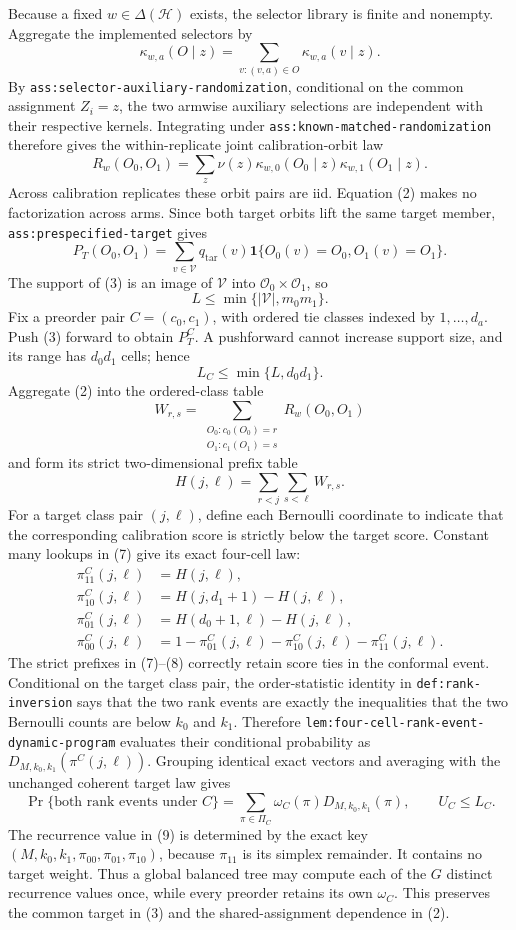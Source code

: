 Because a fixed \(w\in\Delta(\mathcal H)\) exists, the selector library is finite and nonempty. Aggregate the implemented selectors by
\[
\kappa_{w,a}(O\mid z)=\sum_{v:(v,a)\in O}\kappa_{w,a}(v\mid z).
\tag{1}
\]
By \texttt{ass:selector-auxiliary-randomization}, conditional on the common assignment \(Z_i=z\), the two armwise auxiliary selections are independent with their respective kernels. Integrating under \texttt{ass:known-matched-randomization} therefore gives the within-replicate joint calibration-orbit law
\[
R_w(O_0,O_1)=\sum_z\nu(z)\kappa_{w,0}(O_0\mid z)\kappa_{w,1}(O_1\mid z).
\tag{2}
\]
Across calibration replicates these orbit pairs are iid. Equation (2) makes no factorization across arms. Since both target orbits lift the same target member, \texttt{ass:prespecified-target} gives
\[
P_T(O_0,O_1)=\sum_{v\in\mathcal V}q_{\mathrm{tar}}(v)\mathbf 1\{O_0(v)=O_0, O_1(v)=O_1\}.
\tag{3}
\]
The support of (3) is an image of \(\mathcal V\) into \(\mathcal O_0\times\mathcal O_1\), so
\[
L\le\min\{|\mathcal V|,m_0m_1\}.
\tag{4}
\]
Fix a preorder pair \(C=(c_0,c_1)\), with ordered tie classes indexed by \(1,\ldots,d_a\). Push (3) forward to obtain \(P_T^C\). A pushforward cannot increase support size, and its range has \(d_0d_1\) cells; hence
\[
L_C\le\min\{L,d_0d_1\}.
\tag{5}
\]
Aggregate (2) into the ordered-class table
\[
W_{r,s}=\sum_{\substack{O_0:c_0(O_0)=r\\O_1:c_1(O_1)=s}}R_w(O_0,O_1)
\tag{6}
\]
and form its strict two-dimensional prefix table
\[
H(j,\ell)=\sum_{r<j}\sum_{s<\ell}W_{r,s}.
\tag{7}
\]
For a target class pair \((j,\ell)\), define each Bernoulli coordinate to indicate that the corresponding calibration score is strictly below the target score. Constant many lookups in (7) give its exact four-cell law:
\[
\begin{aligned}
\pi^C_{11}(j,\ell)&=H(j,\ell),\\
\pi^C_{10}(j,\ell)&=H(j,d_1+1)-H(j,\ell),\\
\pi^C_{01}(j,\ell)&=H(d_0+1,\ell)-H(j,\ell),\\
\pi^C_{00}(j,\ell)&=1-\pi^C_{01}(j,\ell)-\pi^C_{10}(j,\ell)-\pi^C_{11}(j,\ell).
\end{aligned}
\tag{8}
\]
The strict prefixes in (7)--(8) correctly retain score ties in the conformal event. Conditional on the target class pair, the order-statistic identity in \texttt{def:rank-inversion} says that the two rank events are exactly the inequalities that the two Bernoulli counts are below \(k_0\) and \(k_1\). Therefore \texttt{lem:four-cell-rank-event-dynamic-program} evaluates their conditional probability as \(D_{M,k_0,k_1}(\pi^C(j,\ell))\). Grouping identical exact vectors and averaging with the unchanged coherent target law gives
\[
\Pr\{\text{both rank events under }C\}=\sum_{\pi\in\Pi_C}\omega_C(\pi)D_{M,k_0,k_1}(\pi),\qquad U_C\le L_C.
\tag{9}
\]
The recurrence value in (9) is determined by the exact key \((M,k_0,k_1,\pi_{00},\pi_{01},\pi_{10})\), because \(\pi_{11}\) is its simplex remainder. It contains no target weight. Thus a global balanced tree may compute each of the \(G\) distinct recurrence values once, while every preorder retains its own \(\omega_C\). This preserves the common target in (3) and the shared-assignment dependence in (2).

